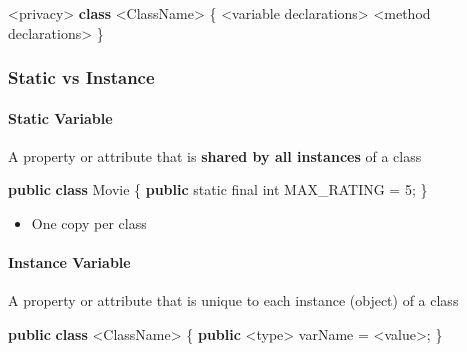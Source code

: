 \documentclass[]{article}
\newenvironment{Shaded}{}{}
\newcommand{\DataTypeTok}[1]{\textcolor[rgb]{0.56,0.13,0.00}{#1}}
\newcommand{\DecValTok}[1]{\textcolor[rgb]{0.25,0.63,0.44}{#1}}
\newcommand{\KeywordTok}[1]{\textcolor[rgb]{0.00,0.44,0.13}{\textbf{#1}}}
\newcommand{\NormalTok}[1]{#1}
\providecommand{\tightlist}{%
  \setlength{\itemsep}{0pt}\setlength{\parskip}{0pt}}
\let\oldparagraph\paragraph
\renewcommand{\paragraph}[1]{\oldparagraph{#1}\mbox{}}
\begin{document}
\begin{Shaded}
\begin{Highlighting}[]
\NormalTok{<privacy> }\KeywordTok{class}\NormalTok{ <ClassName> \{}
\NormalTok{    <variable declarations>}
\NormalTok{    <method declarations>}
\NormalTok{\}}
\end{Highlighting}
\end{Shaded}

\hypertarget{static-vs-instance}{%
\subsubsection{Static vs Instance}\label{static-vs-instance}}

\hypertarget{static-variable}{%
\paragraph{Static Variable}\label{static-variable}}

A property or attribute that is \textbf{shared by all instances} of a
class

\begin{Shaded}
\begin{Highlighting}[]
\KeywordTok{public} \KeywordTok{class}\NormalTok{ Movie \{}
    \KeywordTok{public} \DataTypeTok{static} \DataTypeTok{final} \DataTypeTok{int}\NormalTok{ MAX_RATING = }\DecValTok{5}\NormalTok{;}
\NormalTok{\}}
\end{Highlighting}
\end{Shaded}

\begin{itemize}
\tightlist
\item
  One copy per class
\end{itemize}

\hypertarget{instance-variable}{%
\paragraph{Instance Variable}\label{instance-variable}}

A property or attribute that is unique to each instance (object) of a
class

\begin{Shaded}
\begin{Highlighting}[]
\KeywordTok{public} \KeywordTok{class}\NormalTok{ <ClassName> \{}
    \KeywordTok{public}\NormalTok{ <type> varName = <value>;}
\NormalTok{\}}
\end{Highlighting}
\end{Shaded}
\end{document}
